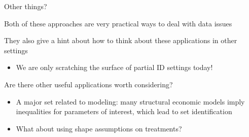 \documentclass[notes,11pt, aspectratio=169]{beamer}
\newenvironment{wideitemize}{\itemize\addtolength{\itemsep}{10pt}}{\enditemize}
\begin{document}
\begin{frame}{Other things?}
  \begin{wideitemize}
  \item Both of these approaches are very practical ways to deal with
    data issues
  \item They also give a hint about how to think about these
    applications in other settings
    \begin{itemize}
    \item We are only scratching the surface of partial ID settings today!
    \end{itemize}
  \item Are there other useful applications worth considering?
    \begin{itemize}
    \item A major set related to modeling: many structural economic
      models imply inequalities for parameters of interest, which lead
      to set identification
    \item What about using shape assumptions on treatments?
    \end{itemize}
  \end{wideitemize}

\end{frame}

            
\end{document}
